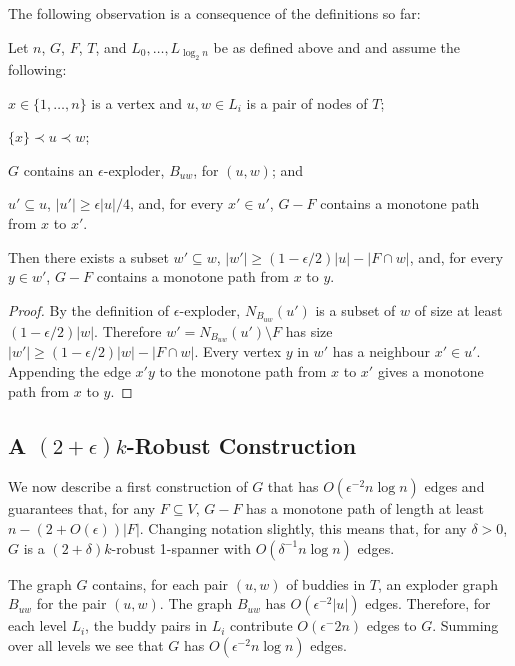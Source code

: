 \documentclass{patmorin}
\begin{document}
The following observation is a consequence of the definitions so far:

\begin{obs}
  Let $n$, $G$, $F$, $T$, and $L_0,\ldots,L_{\log_2 n}$ be as defined above and
  and assume the following:
  \begin{compactenum}
     \item $x\in \{1,\ldots,n\}$ is a vertex and $u,w\in L_i$ 
      is a pair of nodes of $T$;
     \item $\{x\} \prec u\prec w$;
     \item $G$ contains an $\epsilon$-exploder, $B_{uw}$, for $(u,w)$; and
     \item $u'\subseteq u$, $|u'|\ge\epsilon|u|/4$, and, for every $x'\in u'$, $G-F$
   contains a monotone path from $x$ to $x'$.
   \end{compactenum}
   Then there exists a
  subset $w'\subseteq w$, $|w'|\ge(1-\epsilon/2)|u|-|F\cap w|$, and, for
   every $y\in w'$, $G-F$ contains a monotone path from $x$ to $y$.
\end{obs}

\begin{proof}
  By the definition of $\epsilon$-exploder, $N_{B_{uw}}(u')$ is a
  subset of $w$ of size at least $(1-\epsilon/2)|w|$. Therefore
  $w'=N_{B_{uw}}(u')\setminus F$ has size $|w'|\ge
  (1-\epsilon/2)|w|-|F\cap w|$.  Every vertex $y$ in $w'$ has a neighbour
  $x'\in u'$. Appending the edge $x'y$ to the monotone path from $x$
  to $x'$ gives a monotone path from $x$ to $y$.
\end{proof}
   
  
\subsection{A $(2+\epsilon)k$-Robust Construction}

We now describe a first construction of $G$ that has $O(\epsilon^{-2}n\log
n)$ edges and guarantees that, for any $F\subseteq V$,  $G-F$ has a
monotone path of length at least $n-(2+O(\epsilon))|F|$.  Changing
notation slightly, this means that, for any $\delta >0$, $G$ is a
$(2+\delta)k$-robust 1-spanner with $O(\delta^{-1}n\log n)$ edges.

The graph $G$ contains, for each pair $(u,w)$ of buddies in $T$, an
exploder graph $B_{uw}$ for the pair $(u,w)$.  The graph $B_{uw}$ has $O(\epsilon^{-2}|u|)$ edges. Therefore, for each level $L_i$, the buddy pairs in $L_i$ contribute $O(\epsilon^-2 n)$ edges to $G$.  Summing over all levels we see that $G$ has $O(\epsilon^{-2}n\log n)$ edges.
\end{document}

